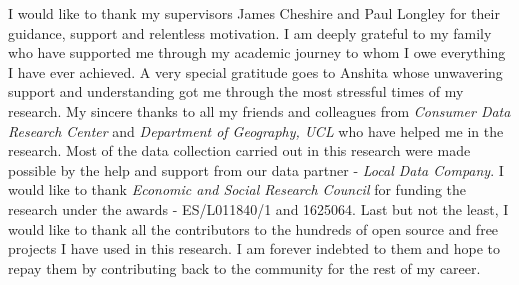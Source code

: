 I would like to thank my supervisors James Cheshire and Paul Longley for their guidance, support and relentless motivation.
I am deeply grateful to my family who have supported me through my academic journey to whom I owe everything I have ever achieved.
A very special gratitude goes to Anshita whose unwavering support and understanding got me through the most stressful times of my research.
My sincere thanks to all my friends and colleagues from \textit{Consumer Data Research Center} and \textit{Department of Geography, UCL} who have helped me in the research.
Most of the data collection carried out in this research were made possible by the help and support from our data partner - \textit{Local Data Company}.
I would like to thank \textit{Economic and Social Research Council} for funding the research under the awards - ES/L011840/1 and 1625064.
Last but not the least, I would like to thank all the contributors to the hundreds of open source and free projects I have used in this research. I am forever indebted to them and hope to repay them by contributing back to the community for the rest of my career.
